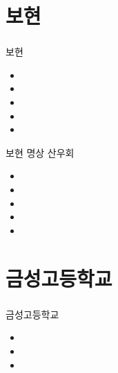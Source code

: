 \documentclass[aspectratio=1610,20pt,xcolor=pdftex,dvipsnames,table,handout]{beamer}
\begin{document}
		\section{보현}
		\begin{frame} [t,plain]
		\frametitle{}

			\begin{block} {보현}
			\setlength{\leftmargini}{1em}			
			\begin{itemize}
				\item 	\hrulefill
				\item 	\hrulefill
				\item 	\hrulefill
				\item 	\hrulefill
				\item 	\hrulefill
			\end{itemize}
			\end{block}						

			

			\begin{block} {보현 명상 산우회 }
			\setlength{\leftmargini}{1em}			
			\begin{itemize}
				\item 	\hrulefill
				\item 	\hrulefill
				\item 	\hrulefill
				\item 	\hrulefill
				\item 	\hrulefill
			\end{itemize}
			\end{block}						

		\end{frame}					

		\section{금성고등학교}
		\begin{frame} [t,plain]
		\frametitle{}
			\begin{block} {금성고등학교}
			\setlength{\leftmargini}{1em}			
			\begin{itemize}
				\item 	\hrulefill
				\item 	\hrulefill
				\item 	\hrulefill
			\end{itemize}
			\end{block}						
		\end{frame}					
\end{document}
